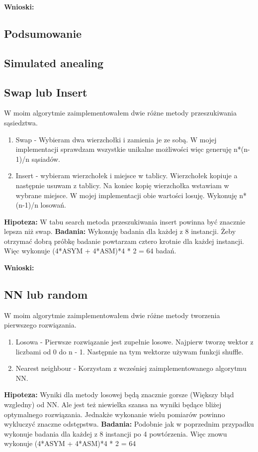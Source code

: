 \documentclass{article}
\begin{document}
        \textbf{Wnioski: } 

      \subsection{Podsumowanie}
    \subsection{Simulated anealing}
      \subsection{Swap lub Insert}
        W moim algorytmie zaimplementowałem dwie różne metody przeszukiwania sąsiedztwa.
        \begin{enumerate}
          \item Swap - Wybieram dwa wierzchołki i zamienia je ze sobą. W mojej implementacji
          sprawdzam wszystkie unikalne możliwości więc generuję n*(n-1)/n sąsiadów.
          \item Insert - wybieram wierzchołek i miejsce w tablicy. Wierzchołek kopiuje a następnie 
          usuwam z tablicy. Na koniec kopię wierzchołka wstawiam w wybrane miejsce. W mojej 
          implementacji obie wartości losuję. Wykonuję n*(n-1)/n losowań.
        \end{enumerate}
        \textbf{Hipoteza: } W tabu search metoda przeszukiwania insert powinna być znacznie lepsza
        niż swap.
        \textbf{Badania: } Wykonuję badania dla każdej z 8 instancji. Żeby otrzymać dobrą próbkę 
        badanie powtarzam cztero krotnie dla każdej instancji. Więc wykonuje (4*ASYM + 4*ASM)*4 * 2 = 64
        badań. 

        \textbf{Wnioski: } 
      \subsection{NN lub random}
        W moim algorytmie zaimplementowałem dwie różne metody tworzenia pierwszego rozwiązania.
        \begin{enumerate}
          \item Losowa - Pierwsze rozwiązanie jest zupełnie losowe. Najpierw tworzę wektor z liczbami
          od 0 do n - 1. Następnie na tym wektorze używam funkcji shuffle. 
          \item Nearest neighbour - Korzystam z wcześniej zaimplementowanego algorytmu NN. 
        \end{enumerate}
        \textbf{Hipoteza: } Wyniki dla metody losowej będą znacznie gorsze (Większy błąd wzgledny) od NN.
        Ale jest też niewielka szansa na wyniki będące bliżej optymalnego rozwiązania. Jednakże wykonanie
        wielu pomiarów powinno wykluczyć znaczne odstępstwa.\linebreak
        \textbf{Badania: } Podobnie jak w poprzednim przypadku wykonuje badania dla każdej z 8 instancji
        po 4 powtórzenia. Więc znowu wykonuje (4*ASYM + 4*ASM)*4 * 2 = 64\linebreak
\end{document}

